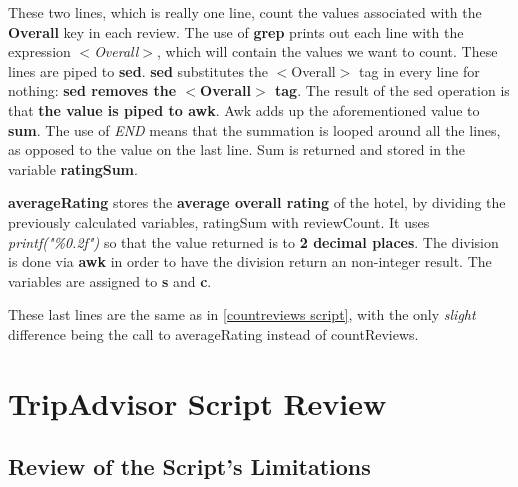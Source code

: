\documentclass{article}
\begin{document}
	
	
	
	These two lines, which is really one line, count the values associated with the \textbf{Overall} key in each review. \newline
	The use of \textbf{grep} prints out each line with the expression \textit{$<$Overall$>$}, which will contain the values we want to count. These lines are piped to \textbf{sed}. \newline
	\textbf{sed} substitutes the $<$Overall$>$ tag in every line for nothing: \textbf{sed removes the $<$Overall$>$ tag}. The result of the sed operation is that \textbf{the value is piped to awk}.
	\newline
	Awk adds up the aforementioned value to \textbf{sum}. The use of \textit{END} means that the summation is looped around all the lines, as opposed to the value on the last line. Sum is returned and stored in the variable \textbf{ratingSum}.
	

	
	
	\textbf{averageRating} stores the \textbf{average overall rating} of the hotel, by dividing the previously calculated variables, ratingSum with reviewCount. It uses \textit{printf("\%0.2f")} so that the value returned is to \textbf{2 decimal places}. The division is done via \textbf{awk} in order to have the division return an non-integer result. The variables are assigned to \textbf{s} and \textbf{c}. 
	

	
	
	These last lines are the same as in \ref{countreviews script}, with the only \textit{slight} difference being the call to averageRating instead of countReviews. \newline
	
	\newpage
	
	\section{TripAdvisor Script Review} \label{Review}
	
	\subsection{Review of the Script's Limitations} \label{Script Limitations}
	
\end{document}
